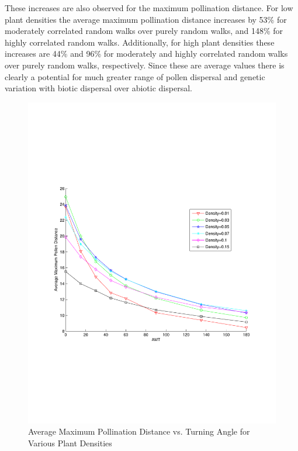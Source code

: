 These increases are also observed for the maximum pollination distance.  For low plant densities the average maximum pollination distance increases by 53\% for moderately correlated random walks over purely random walks, and 148\% for highly correlated random walks.
 Additionally, for high plant
densities these increases are 44\% and 96\% for moderately and highly correlated random walks over purely random walks, respectively.  Since these are average values there is clearly a potential for much greater range of pollen dispersal and genetic variation with biotic dispersal over abiotic dispersal.

\begin{figure}
  \begin{center}
  \includegraphics[scale=0.5, trim=50 240 50 300]{MaxPollenVsAMT.pdf}
  \end{center}
  \caption{\small Average Maximum Pollination Distance vs. Turning Angle for Various Plant Densities}
  \label{AvgMaxDTreesN}
\end{figure}

